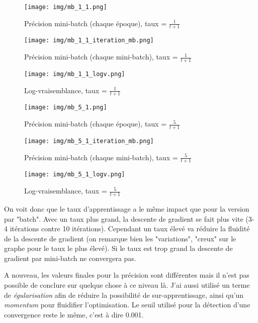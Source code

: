 \documentclass[12pt]{article}
\begin{document}
\begin{figure}[H]
\begin{center}
	\texttt{[image: img/mb\_1\_1.png]}
	\caption{Précision mini-batch (chaque époque), taux = $\frac{1}{t+1}$}
\end{center}
\end{figure}
\begin{figure}[H]
\begin{center}
	\texttt{[image: img/mb\_1\_1\_iteration\_mb.png]}
	\caption{Précision mini-batch (chaque mini-batch), taux = $\frac{1}{t+1}$}
\end{center}
\end{figure}
\begin{figure}[H]
\begin{center}
	\texttt{[image: img/mb\_1\_1\_logv.png]}
	\caption{Log-vraisemblance, taux = $\frac{1}{t+1}$}
\end{center}
\end{figure}
\begin{figure}[H]
\begin{center}
	\texttt{[image: img/mb\_5\_1.png]}
	\caption{Précision mini-batch (chaque époque), taux = $\frac{5}{t+1}$}
\end{center}
\end{figure}
\begin{figure}[H]
\begin{center}
	\texttt{[image: img/mb\_5\_1\_iteration\_mb.png]}
	\caption{Précision mini-batch (chaque mini-batch), taux = $\frac{5}{t+1}$}
\end{center}
\end{figure}
\begin{figure}[H]
\begin{center}
	\texttt{[image: img/mb\_5\_1\_logv.png]}
	\caption{Log-vraisemblance, taux = $\frac{5}{t+1}$}
\end{center}
\end{figure}


On voit donc que le taux d'apprentissage a le même impact que pour la version par "batch". Avec un taux plus grand, la descente de gradient se fait plus vite (3-4 itérations contre 10 itérations). Cependant un taux élevé va réduire la fluidité de la descente de gradient (on remarque bien les "variations", "creux" sur le graphe pour le taux le plus élevé). Si le taux est trop grand la descente de gradient par mini-batch ne convergera pas.

A nouveau, les valeurs finales pour la précision sont différentes mais il n'est pas possible de conclure sur quelque chose à ce niveau là. J'ai aussi utilisé un terme de \textit{égularisation} afin de réduire la possibilité de sur-apprentissage, ainsi qu'un \textit{momentum} pour fluidifier l'optimisation. Le seuil utilisé pour la détection d'une convergence reste le même, c'est à dire 0.001. 
\end{document}
